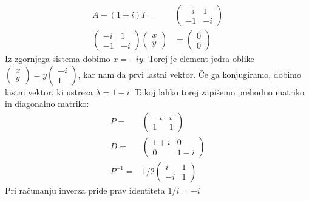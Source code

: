 \documentclass{article}
\begin{document}
\begin{align*}
A-(1+i)I  =&
\begin{pmatrix}
-i & 1 \\
-1  & -i
\end{pmatrix} \\
\begin{pmatrix}
-i & 1 \\
-1  & -i
\end{pmatrix} 
\begin{pmatrix}
x \\ y \end{pmatrix} &= \begin{pmatrix} 0 \\ 0 \end{pmatrix}
\end{align*}
Iz zgornjega sistema dobimo $x = -iy$. Torej je element jedra oblike $\begin{pmatrix} x \\ y \end{pmatrix} = y \begin{pmatrix} -i \\ 1 \end{pmatrix}$, kar nam da prvi lastni vektor. Če ga konjugiramo, dobimo lastni vektor, ki ustreza $\lambda = 1-i$.
Takoj lahko torej zapišemo prehodno matriko in diagonalno matriko:
\begin{align*}
P  =&
\begin{pmatrix}
-i & i \\
1  & 1
\end{pmatrix} \\
D =& 
\begin{pmatrix}
1+i & 0 \\
0  & 1-i
\end{pmatrix} \\
P^{-1} =& 1/2
\begin{pmatrix}
i & 1 \\
-i & 1
\end{pmatrix}
\end{align*}
Pri računanju inverza pride prav identiteta $1/i = -i$
\vspace{1em}
\end{document}
